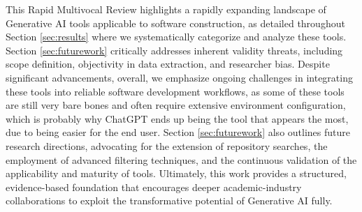 This Rapid Multivocal Review highlights a rapidly expanding landscape of Generative AI tools applicable to software construction, as detailed throughout Section \ref{sec:results} where we systematically categorize and analyze these tools. Section \ref{sec:futurework} critically addresses inherent validity threats, including scope definition, objectivity in data extraction, and researcher bias. Despite significant advancements, overall, we emphasize ongoing challenges in integrating these tools into reliable software development workflows, as some of these tools are still very bare bones and often require extensive environment configuration, which is probably why ChatGPT ends up being the tool that appears the most, due to being easier for the end user. Section \ref{sec:futurework} also outlines future research directions, advocating for the extension of repository searches, the employment of advanced filtering techniques, and the continuous validation of the applicability and maturity of tools. Ultimately, this work provides a structured, evidence-based foundation that encourages deeper academic-industry collaborations to exploit the transformative potential of Generative AI fully.

